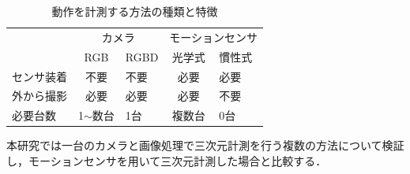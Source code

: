 \documentclass[titlepage]{jarticle}
\begin{document}
\begin{table}[t!]
  \centering
  \caption{動作を計測する方法の種類と特徴}
  \begin{tabular}{l|ll|ll}
    \hline
                  & \multicolumn{2}{c|}{\small{カメラ}}       & \multicolumn{2}{c}{\small{モーションセンサ}}                                                  \\ \cline{2-5}
                  & \multicolumn{1}{c|}{\small{RGB}}       & \small{RGBD}                         & \multicolumn{1}{c|}{\small{光学式}} & \small{慣性式} \\ \hline
    \small{センサ装着} & \multicolumn{1}{c|}{\small{不要}}        & \small{不要}                           & \multicolumn{1}{c|}{\small{必要}}  & \small{必要}  \\
    \small{外から撮影} & \multicolumn{1}{c|}{\small{必要}}        & \small{必要}                           & \multicolumn{1}{c|}{\small{必要}}  & \small{不要}  \\
    \small{必要台数}  & \multicolumn{1}{c|}{\small{1$\sim$数台}} & \small{1台}                           & \multicolumn{1}{c|}{\small{複数台}} & \small{0台}  \\ \hline
  \end{tabular}
  \label{3D_1}
\end{table}


本研究では一台のカメラと画像処理で三次元計測を行う複数の方法について検証し，モーションセンサを用いて三次元計測した場合と比較する．

%
%
\end{document}
